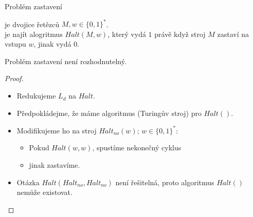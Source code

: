     \begin{frame}{Problém zastavení}
    \begin{definition}
     je dvojice řetězců $M,w\in \{0,1\}^*$.\\  je najít alogritmus $Halt(M,w)$, který vydá $1$ právě když stroj $M$ zastaví na vstupu $w$, jinak vydá $0$.
    \end{definition}
    \begin{theorem*}
    Problém zastavení není rozhodnutelný.
    \end{theorem*}
    
    
    \begin{proof}
    \begin{itemize}%
        \item Redukujeme $L_d$ na $Halt$.
            \item Předpokládejme, že máme algoritmus (Turingův stroj) pro $Halt()$.
            \item Modifikujeme ho na stroj $Halt_{no}(w)$; $w\in \{0,1\}^*$:
        \begin{itemize}
            \item Pokud $Halt(w,w)$, spustíme nekonečný cyklus
            \item jinak zastavíme.
        \end{itemize}
        \item Otázka $Halt(Halt_{no}, Halt_{no})$ není řešitelná, proto algoritmus $Halt()$ nemůže existovat.
    \end{itemize}
    \end{proof}
    \end{frame}
    

